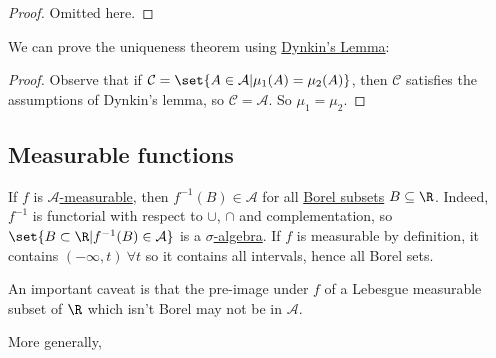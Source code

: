 \documentclass{article}
\newcommand{\1}[1]{\mathbbm{1}_{#1}}
\begin{document}
\begin{proof}
    Omitted here.
\end{proof}

We can prove the uniqueness theorem using \hyperlink{lem:dynkin}{Dynkin's Lemma}:
\begin{proof}
    Observe that if $\mathcal{C} = \set{A \in \mathcal{A} | \mu_1(A) = \mu_2(A)}$, then $\mathcal{C}$ satisfies the assumptions of Dynkin's lemma, so $\mathcal{C} = \mathcal{A}$. So $\mu_1 = \mu_2$.
\end{proof}


\subsection{Measurable functions}

\begin{remark}
    If $f$ is \hyperlink{def:measurableFunctoR}{$\mathcal{A}$-measurable}, then $f^{-1}(B) \in \mathcal{A}$ for all \hyperlink{def:borelAlg}{Borel subsets} $B \subseteq \R$.
    Indeed, $f^{-1}$ is functorial with respect to $\cup$, $\cap$ and complementation, so $\set{B \subset \R | f^{-1} (B) \in \mathcal{A}}$ is a \hyperlink{def:sigAlg}{$\sigma$-algebra}.
    If $f$ is measurable by definition, it contains $(-\infty, t) \ \forall t$ so it contains all intervals, hence all Borel sets.

    An important caveat is that the pre-image under $f$ of a Lebesgue measurable subset of $\R$ which isn't Borel may not be in $\mathcal{A}$.
\end{remark}

More generally,
\end{document}
